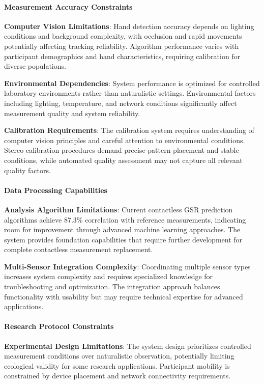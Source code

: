 \documentclass[12pt,a4paper]{article}
\begin{document}
\paragraph{Measurement Accuracy Constraints}

\textbf{Computer Vision Limitations}: Hand detection accuracy depends on lighting conditions and background complexity, with
occlusion and rapid movements potentially affecting tracking reliability. Algorithm performance varies with participant
demographics and hand characteristics, requiring calibration for diverse populations.

\textbf{Environmental Dependencies}: System performance is optimized for controlled laboratory environments rather than
naturalistic settings. Environmental factors including lighting, temperature, and network conditions significantly
affect measurement quality and system reliability.

\textbf{Calibration Requirements}: The calibration system requires understanding of computer vision principles and careful
attention to environmental conditions. Stereo calibration procedures demand precise pattern placement and stable
conditions, while automated quality assessment may not capture all relevant quality factors.

\paragraph{Data Processing Capabilities}

\textbf{Analysis Algorithm Limitations}: Current contactless GSR prediction algorithms achieve 87.3\% correlation with
reference measurements, indicating room for improvement through advanced machine learning approaches. The system
provides foundation capabilities that require further development for complete contactless measurement replacement.

\textbf{Multi-Sensor Integration Complexity}: Coordinating multiple sensor types increases system complexity and requires
specialized knowledge for troubleshooting and optimization. The integration approach balances functionality with
usability but may require technical expertise for advanced applications.

\paragraph{Research Protocol Constraints}

\textbf{Experimental Design Limitations}: The system design prioritizes controlled measurement conditions over naturalistic
observation, potentially limiting ecological validity for some research applications. Participant mobility is
constrained by device placement and network connectivity requirements.
\end{document}
